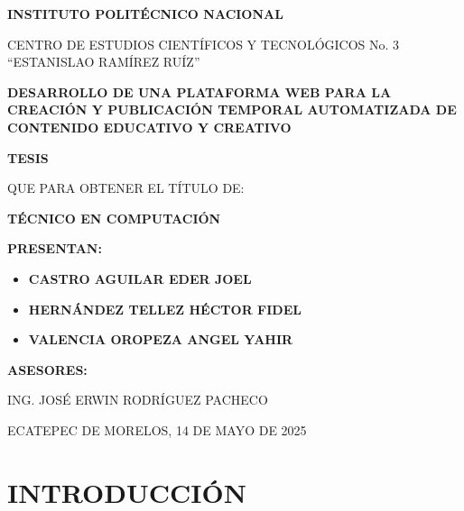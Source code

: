 \documentclass[12pt,a4paper]{report}
\begin{document}
\begin{titlepage}
\centering

\vspace*{1cm}

{\Large \textbf{INSTITUTO POLITÉCNICO NACIONAL}}

\vspace{0.5cm}

{\large CENTRO DE ESTUDIOS CIENTÍFICOS Y TECNOLÓGICOS No. 3 ``ESTANISLAO RAMÍREZ RUÍZ''}

\vspace{2cm}

{\LARGE \textbf{DESARROLLO DE UNA PLATAFORMA WEB PARA LA CREACIÓN Y PUBLICACIÓN TEMPORAL AUTOMATIZADA DE CONTENIDO EDUCATIVO Y CREATIVO}}

\vspace{2cm}

{\Large \textbf{TESIS}}

\vspace{0.5cm}

{\large QUE PARA OBTENER EL TÍTULO DE:}

{\Large \textbf{TÉCNICO EN COMPUTACIÓN}}

\vspace{1.5cm}

{\large \textbf{PRESENTAN:}}

\vspace{0.5cm}

\begin{itemize}
\item \textbf{CASTRO AGUILAR EDER JOEL}
\item \textbf{HERNÁNDEZ TELLEZ HÉCTOR FIDEL}
\item \textbf{VALENCIA OROPEZA ANGEL YAHIR}
\end{itemize}

\vspace{1cm}

{\large \textbf{ASESORES:}}

{\large ING. JOSÉ ERWIN RODRÍGUEZ PACHECO}

\vfill

{\large ECATEPEC DE MORELOS, 14 DE MAYO DE 2025}

\end{titlepage}

\tableofcontents
\newpage

\chapter*{INTRODUCCIÓN}
\end{document}
